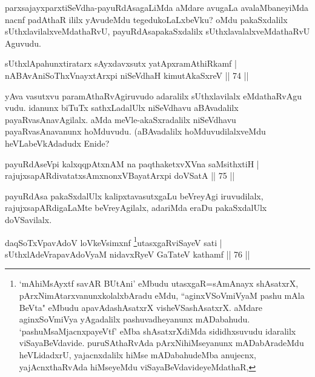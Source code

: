\begin{artha}
parxsajayxparxtiSeVdha-payuRdAsagaLiMda aMdare avugaLa avalaMbaneyiMda nacnf padAthaR ililx yAvudeMdu tegedukoLaLxbeVku? oMdu pakaSxdalilx sUthxlavilalxveMdathaRvU, payuRdAsapakaSxdalilx sUthxlavalalxveMdathaRvU Aguvudu.
\end{artha}


\begin{shl}
sUthxlApahunxtiratarx sAyxdavxsutx yatApxramAthiRkamf |\\
nABAvAniSoThxV\s nayxtArxpi niSeVdhaH kimutAkaSxreV \hfill || 74 ||
\end{shl}

\begin{artha}
yAva vasutxvu paramAthaRvAgiruvudo adaralilx sUthxlavilalx eMdathaRvAgu	vudu. idanunx biTuTx sathxLadalUlx niSeVdhavu aBAvadalilx payaRvasAnavAgilalx. aMda meVle-akaSxradalilx niSeVdhavu payaRvasAnavanunx hoMduvudu. (aBAvadalilx hoMduvudilalxveMdu heVLabeVkAdadudx Enide?
\end{artha}

\begin{shl}
payuRdAseV\s pi kalxqqpAtxnAM na paqthaketxvXVna saMsithxtiH |\\
rajujxsapARdivatatxsAmxnonxVBayatArxpi doVSatA \hfill || 75 ||
\end{shl}

\begin{artha}%
payuRdAsa pakaSxdalUlx kalipxtavasutxgaLu beVreyAgi iruvudilalx, rajujxsapARdigaLaMte beVreyAgilalx, adariMda eraDu pakaSxdalUlx doVSavilalx.
\end{artha}



\begin{shl}
daqSoTxV\s pavAdoV loVkeV\s simxnf \footnote{`mAhiMsAyxtf savAR BUtAni' eMbudu utasxgaR=sAmAnayx shAsatxrX, pArxNimAtarxvanunx\break kolalxbAradu eMdu, ``aginxVSoVmiVyaM pashu mAla BeVta" eMbudu apavAdashAsatxrX visheVSashAsatxrX. aMdare aginxSoVmiVya yAgadalilx pashuvadheyanunx mADabahudu. `pashuMsaMjacnxpayeVtf' eMba shAsatxrXdiMda sididhxsuvudu idaralilx viSayaBeVdavide. puruSAthaRvAda pArxNihiMseyanunx mADabAradeMdu heVLidadxrU, yajacnxdalilx hiMse mADabahudeMba anujecnx, yajAcnxthaRvAda hiMseyeMdu viSayaBeVdavideyeMdathaR,}utasxgaRviSayeV sati |\\
sUthxlAdeVrapavAdoV\s yaM nidavxRyeV GaTateV kathamf \hfill || 76 ||
\end{shl}

